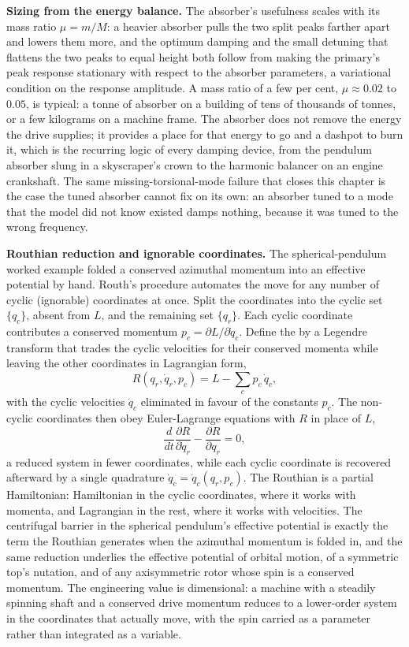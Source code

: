 \textbf{Sizing from the energy balance.} The absorber's usefulness scales with
its mass ratio $\mu = m/M$: a heavier absorber pulls the two split peaks
farther apart and lowers them more, and the optimum damping and the small
detuning that flattens the two peaks to equal height both follow from making
the primary's peak response stationary with respect to the absorber
parameters, a variational condition on the response amplitude. A mass ratio of
a few per cent, $\mu\approx 0.02$ to $0.05$, is typical: a tonne of absorber on
a building of tens of thousands of tonnes, or a few kilograms on a machine
frame. The absorber does not remove the energy the drive supplies; it provides
a place for that energy to go and a dashpot to burn it, which is the recurring
logic of every damping device, from the pendulum absorber slung in a
skyscraper's crown to the harmonic balancer on an engine crankshaft. The same
missing-torsional-mode failure that closes this chapter is the case the tuned
absorber cannot fix on its own: an absorber tuned to a mode that the model did
not know existed damps nothing, because it was tuned to the wrong frequency.

\begin{mastery}
\textbf{Routhian reduction and ignorable coordinates.} The spherical-pendulum
worked example folded a conserved azimuthal momentum into an effective
potential by hand. Routh's procedure automates the move for any number of
cyclic (ignorable) coordinates at once. Split the coordinates into the cyclic
set $\{q_c\}$, absent from $L$, and the remaining set $\{q_r\}$. Each cyclic
coordinate contributes a conserved momentum $p_c = \partial L/\partial\dot
q_c$. Define the  by a Legendre transform that trades the
cyclic velocities for their conserved momenta while leaving the other
coordinates in Lagrangian form,
\[
R(q_r,\dot q_r, p_c)
= L - \sum_c p_c\,\dot q_c,
\]
with the cyclic velocities $\dot q_c$ eliminated in favour of the constants
$p_c$. The non-cyclic coordinates then obey Euler-Lagrange equations with $R$
in place of $L$,
\[
\frac{d}{dt}\frac{\partial R}{\partial\dot q_r}
- \frac{\partial R}{\partial q_r} = 0,
\]
a reduced system in fewer coordinates, while each cyclic coordinate is
recovered afterward by a single quadrature $\dot q_c = \dot q_c(q_r, p_c)$. The
Routhian is a partial Hamiltonian: Hamiltonian in the cyclic coordinates,
where it works with momenta, and Lagrangian in the rest, where it works with
velocities. The centrifugal barrier in the spherical pendulum's effective
potential is exactly the term the Routhian generates when the azimuthal
momentum is folded in, and the same reduction underlies the effective potential
of orbital motion, of a symmetric top's nutation, and of any axisymmetric
rotor whose spin is a conserved momentum. The engineering value is dimensional:
a machine with a steadily spinning shaft and a conserved drive momentum reduces
to a lower-order system in the coordinates that actually move, with the spin
carried as a parameter rather than integrated as a variable.
\end{mastery}

